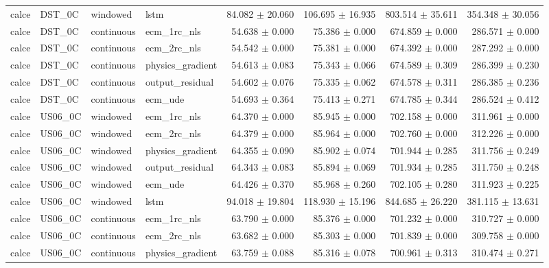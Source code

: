 \begin{longtable}{llllrrrr}
calce & DST\_0C & windowed & lstm & 84.082 $\pm$ 20.060 & 106.695 $\pm$ 16.935 & 803.514 $\pm$ 35.611 & 354.348 $\pm$ 30.056 \\
calce & DST\_0C & continuous & ecm\_1rc\_nls & 54.638 $\pm$ 0.000 & 75.386 $\pm$ 0.000 & 674.859 $\pm$ 0.000 & 286.571 $\pm$ 0.000 \\
calce & DST\_0C & continuous & ecm\_2rc\_nls & 54.542 $\pm$ 0.000 & 75.381 $\pm$ 0.000 & 674.392 $\pm$ 0.000 & 287.292 $\pm$ 0.000 \\
calce & DST\_0C & continuous & physics\_gradient & 54.613 $\pm$ 0.083 & 75.343 $\pm$ 0.066 & 674.589 $\pm$ 0.309 & 286.399 $\pm$ 0.230 \\
calce & DST\_0C & continuous & output\_residual & 54.602 $\pm$ 0.076 & 75.335 $\pm$ 0.062 & 674.578 $\pm$ 0.311 & 286.385 $\pm$ 0.236 \\
calce & DST\_0C & continuous & ecm\_ude & 54.693 $\pm$ 0.364 & 75.413 $\pm$ 0.271 & 674.785 $\pm$ 0.344 & 286.524 $\pm$ 0.412 \\
calce & US06\_0C & windowed & ecm\_1rc\_nls & 64.370 $\pm$ 0.000 & 85.945 $\pm$ 0.000 & 702.158 $\pm$ 0.000 & 311.961 $\pm$ 0.000 \\
calce & US06\_0C & windowed & ecm\_2rc\_nls & 64.379 $\pm$ 0.000 & 85.964 $\pm$ 0.000 & 702.760 $\pm$ 0.000 & 312.226 $\pm$ 0.000 \\
calce & US06\_0C & windowed & physics\_gradient & 64.355 $\pm$ 0.090 & 85.902 $\pm$ 0.074 & 701.944 $\pm$ 0.285 & 311.756 $\pm$ 0.249 \\
calce & US06\_0C & windowed & output\_residual & 64.343 $\pm$ 0.083 & 85.894 $\pm$ 0.069 & 701.934 $\pm$ 0.285 & 311.750 $\pm$ 0.248 \\
calce & US06\_0C & windowed & ecm\_ude & 64.426 $\pm$ 0.370 & 85.968 $\pm$ 0.260 & 702.105 $\pm$ 0.280 & 311.923 $\pm$ 0.225 \\
calce & US06\_0C & windowed & lstm & 94.018 $\pm$ 19.804 & 118.930 $\pm$ 15.196 & 844.685 $\pm$ 26.220 & 381.115 $\pm$ 13.631 \\
calce & US06\_0C & continuous & ecm\_1rc\_nls & 63.790 $\pm$ 0.000 & 85.376 $\pm$ 0.000 & 701.232 $\pm$ 0.000 & 310.727 $\pm$ 0.000 \\
calce & US06\_0C & continuous & ecm\_2rc\_nls & 63.682 $\pm$ 0.000 & 85.303 $\pm$ 0.000 & 701.839 $\pm$ 0.000 & 309.758 $\pm$ 0.000 \\
calce & US06\_0C & continuous & physics\_gradient & 63.759 $\pm$ 0.088 & 85.316 $\pm$ 0.078 & 700.961 $\pm$ 0.313 & 310.474 $\pm$ 0.271 \\

\end{longtable}
